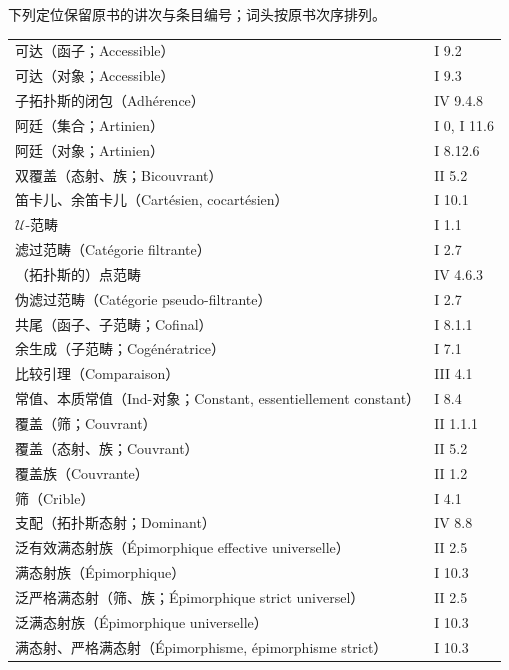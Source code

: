 \noindent 下列定位保留原书的讲次与条目编号；词头按原书次序排列。
\begin{longtable}{@{}p{}p{}@{}}
可达（函子；Accessible） & I 9.2\\
可达（对象；Accessible） & I 9.3\\
子拓扑斯的闭包（Adhérence） & IV 9.4.8\\
阿廷（集合；Artinien） & I $0$, I 11.6\\
阿廷（对象；Artinien） & I 8.12.6\\[3pt]
双覆盖（态射、族；Bicouvrant） & II 5.2\\
笛卡儿、余笛卡儿（Cartésien, cocartésien） & I 10.1\\
$\mathcal U$-范畴 & I 1.1\\
滤过范畴（Catégorie filtrante） & I 2.7\\
（拓扑斯的）点范畴 & IV 4.6.3\\
伪滤过范畴（Catégorie pseudo-filtrante） & I 2.7\\
共尾（函子、子范畴；Cofinal） & I 8.1.1\\
余生成（子范畴；Cogénératrice） & I 7.1\\
比较引理（Comparaison） & III 4.1\\
常值、本质常值（Ind-对象；Constant, essentiellement constant） & I 8.4\\
覆盖（筛；Couvrant） & II 1.1.1\\
覆盖（态射、族；Couvrant） & II 5.2\\
覆盖族（Couvrante） & II 1.2\\
筛（Crible） & I 4.1\\[3pt]
支配（拓扑斯态射；Dominant） & IV 8.8\\
泛有效满态射族（Épimorphique effective universelle） & II 2.5\\
满态射族（Épimorphique） & I 10.3\\
泛严格满态射（筛、族；Épimorphique strict universel） & II 2.5\\
泛满态射族（Épimorphique universelle） & I 10.3\\
满态射、严格满态射（Épimorphisme, épimorphisme strict） & I 10.3\\
\end{longtable}
